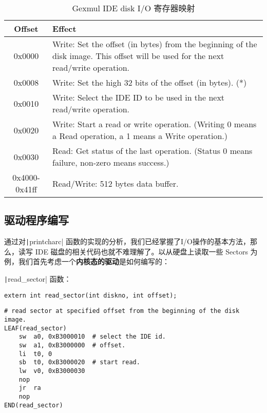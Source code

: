 \begin{table}[htbp]
\caption{Gexmul IDE disk I/O 寄存器映射}\label{lab5-table-disk-mem-map}
\centering
\begin{tabular}{|c|p{12cm}|}
  \hline
    Offset & Effect \\
  \hline
    0x0000 & Write: Set the offset (in bytes) from the beginning of the disk image. This offset will be used for the next read/write operation. \\
  \hline
    0x0008 & Write: Set the high 32 bits of the offset (in bytes). (*) \\
  \hline
    0x0010 & Write: Select the IDE ID to be used in the next read/write operation. \\
  \hline
    0x0020 & Write: Start a read or write operation. (Writing 0 means a Read operation, a 1 means a Write operation.) \\
  \hline
    0x0030 & Read: Get status of the last operation. (Status 0 means failure, non-zero means success.) \\
  \hline
    0x4000-0x41ff  &  Read/Write: 512 bytes data buffer. \\
  \hline
\end{tabular}
\end{table}

\subsection{驱动程序编写}

通过对\texttt|printcharc| 函数的实现的分析，我们已经掌握了I/O操作的基本方法，那么，读写 IDE 磁盘的相关代码也就不难理解了。以从硬盘上读取一些 Sectors 为例，我们首先考虑一个\textbf{内核态的驱动}是如何编写的：

\texttt|read_sector| 函数：

\begin{verbatim}
extern int read_sector(int diskno, int offset);
\end{verbatim}


\begin{verbatim}
# read sector at specified offset from the beginning of the disk image.
LEAF(read_sector)
    sw  a0, 0xB3000010  # select the IDE id.
    sw  a1, 0xB3000000  # offset.
    li  t0, 0
    sb  t0, 0xB3000020  # start read.
    lw  v0, 0xB3000030
    nop
    jr  ra
    nop
END(read_sector)
\end{verbatim}

